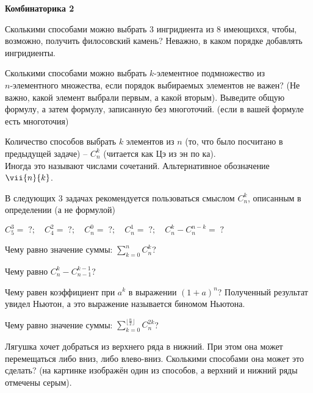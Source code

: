 \centerline{\bf Комбинаторика 2}
\begin{enumerate}
\item Сколькими способами можно выбрать 3 ингридиента из 8 имеющихся, чтобы, возможно, получить филосовский
камень? Неважно, в каком порядке добавлять ингридиенты.
\item Сколькими способами можно выбрать $k$-элементное подмножество из \\ $n$-элементного множества, если порядок
выбираемых элементов не важен? (Не важно, какой элемент выбрали первым, а какой вторым). {\small Выведите
общую формулу, а затем формулу, записанную без многоточий. (если в вашей формуле есть многоточия)}

 Количество способов выбрать $k$ элементов из $n$ (то, что было посчитано в предыдущей
задаче) – $C_n^k$ (читается как Цэ из эн по ка). \\Иногда это называют числами сочетаний. Альтернативное обозначение $\vii{n}{k}$.

В следующих 3 задачах рекомендуется пользоваться смыслом $C_n^k$, описанным в определении (а не
формулой)

\item $ C_5^3 = \;?; \quad C_4^2 = \;?; \quad C_n^0 = \;?; \quad C_n^1 = \;?; \quad C_n^k - C_n^{n - k}
= \;?$

\item Чему равно значение суммы: $\sum_{k=0}^{n} C_n^k$?

\item Чему равно $C_n^k - C_{n - 1}^{k - 1}$?

\item Чему равен коэффициент при $a^k$ в выражении $(1 + a)^n$? Полученный результат увидел Ньютон, а
это выражение называется биномом Ньютона.

\item Чему равно значение суммы: $\sum_{k=0}^{\lfloor \frac{n}{2}\rfloor} C_n^{2k}$?

\begin{minipage}{0.6\textwidth}
\item Лягушка хочет добраться из верхнего ряда в нижний. При этом она может перемещаться либо вниз,
либо влево-вниз. Сколькими способами она может это сделать? (на картинке изображён один из способов,
а верхний и нижний ряды отмечены серым).
\end{minipage}
\begin{minipage}{0.3\textwidth}
\end{minipage}
\end{enumerate}
